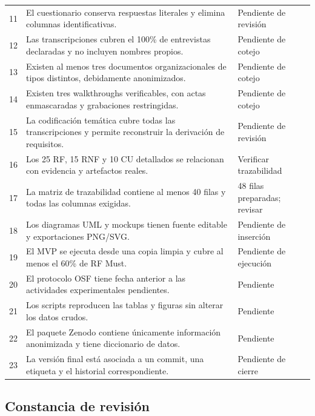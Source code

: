 \documentclass[12pt,a4paper]{article}
\begin{document}
\begin{longtable}{C{0.75cm} L{8.30cm} L{4.45cm}}
11 & El cuestionario conserva respuestas literales y elimina columnas identificativas. & Pendiente de revisión\\
12 & Las transcripciones cubren el 100\% de entrevistas declaradas y no incluyen nombres propios. & Pendiente de cotejo\\
13 & Existen al menos tres documentos organizacionales de tipos distintos, debidamente anonimizados. & Pendiente de cotejo\\
14 & Existen tres walkthroughs verificables, con actas enmascaradas y grabaciones restringidas. & Pendiente de cotejo\\
15 & La codificación temática cubre todas las transcripciones y permite reconstruir la derivación de requisitos. & Pendiente de revisión\\
16 & Los 25 RF, 15 RNF y 10 CU detallados se relacionan con evidencia y artefactos reales. & Verificar trazabilidad\\
17 & La matriz de trazabilidad contiene al menos 40 filas y todas las columnas exigidas. & 48 filas preparadas; revisar\\
18 & Los diagramas UML y mockups tienen fuente editable y exportaciones PNG/SVG. & Pendiente de inserción\\
19 & El MVP se ejecuta desde una copia limpia y cubre al menos el 60\% de RF Must. & Pendiente de ejecución\\
20 & El protocolo OSF tiene fecha anterior a las actividades experimentales pendientes. & Pendiente\\
21 & Los scripts reproducen las tablas y figuras sin alterar los datos crudos. & Pendiente\\
22 & El paquete Zenodo contiene únicamente información anonimizada y tiene diccionario de datos. & Pendiente\\
23 & La versión final está asociada a un commit, una etiqueta y el historial correspondiente. & Pendiente de cierre\\
\end{longtable}

\subsection{Constancia de revisión}
\end{document}
